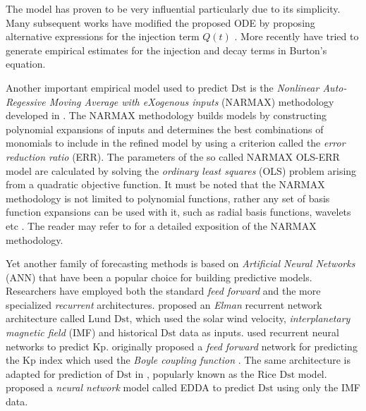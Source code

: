 The \citet{JGR:JGR10260} model has proven to be very influential particularly due to its simplicity. Many subsequent works have modified the proposed ODE by proposing alternative expressions for the injection term $Q(t)$ 
\citep{Wang:Dst,JGRA:JGRA14856}. More recently \citet{Ballatore2014} have tried to generate empirical estimates 
for the injection and decay terms in Burton's equation.

Another important empirical model used to predict $ \mathrm{Dst}$ is the \emph{Nonlinear Auto-Regessive Moving Average with eXogenous inputs} (NARMAX) methodology developed in \citet{doi:10.1080/00207178908559767,GRL:GRL13494,GRL:GRL20944,JGRA:JGRA18657,balikhin:narmax,JGRA:JGRA20661,JGRA:JGRA50192}. The NARMAX methodology builds models by constructing polynomial expansions of inputs and determines the best combinations of monomials to include in the refined model by using a criterion called the \emph{error reduction ratio} (ERR). The parameters of the so called NARMAX OLS-ERR model are calculated by solving the \emph{ordinary least squares} (OLS) problem arising from a quadratic objective function. It must be noted that the NARMAX methodology is not limited to polynomial functions, rather any set of basis function expansions can be used with it, such as radial basis functions, wavelets etc \citep{doi:10.1080/00207720600903011,JGRA:JGRA17327}. The reader may refer to \citet{billings2013nonlinear} for a detailed exposition of the NARMAX methodology.

Yet another family of forecasting methods is based on \emph{Artificial Neural Networks} (ANN) that have been a popular choice for building predictive models. Researchers have employed both the standard \emph{feed forward} and the more specialized \emph{recurrent} architectures. \citet{Lund} proposed an \emph{Elman} recurrent network architecture called Lund $\mathrm{Dst}$, which used the solar wind velocity, \emph{interplanetary magnetic field} (IMF) and historical $\mathrm{Dst}$ data as inputs. \citet{JGRA:JGRA17461} used recurrent neural networks to predict $\mathrm{Kp}$. 
\citet{SWE:SWE286} originally proposed a \emph{feed forward} network for predicting the $\mathrm{Kp}$ index which used the \emph{Boyle coupling function} \citet{boyle1997empirical}. The same architecture is adapted for prediction of $\mathrm{Dst}$ in \citet{SWE:SWE286}, popularly known as the Rice $\mathrm{Dst}$ model. \citet{pallocchia:hal-00318011} proposed a \emph{neural network} model called EDDA to predict $\mathrm{Dst}$ using only the IMF data.

